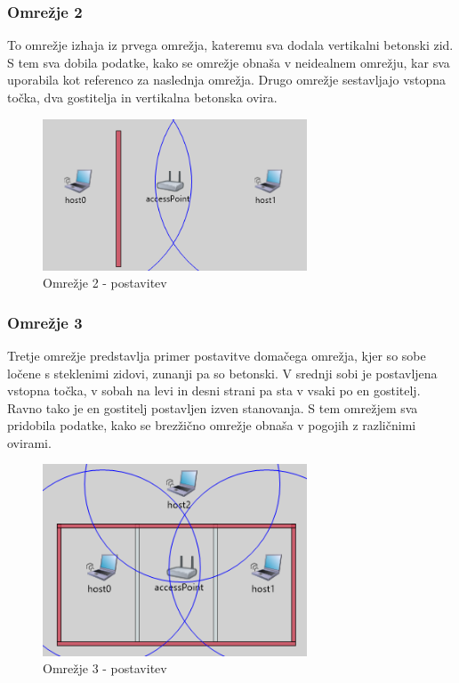 \documentclass[11pt,a4paper,slovene]{myarticle}
\begin{document}
\subsubsection{Omrežje 2}
To omrežje izhaja iz prvega omrežja, kateremu sva dodala vertikalni betonski zid. S tem sva dobila podatke, kako se omrežje obnaša v neidealnem omrežju, kar sva uporabila kot referenco za naslednja omrežja. Drugo omrežje sestavljajo vstopna točka, dva gostitelja in vertikalna betonska ovira.
\begin{figure}[h!]
	\centering
		\includegraphics[width=0.7\textwidth, keepaspectratio=true]{./images/om2-layout.png}
	\caption{Omrežje 2 - postavitev}
	\label{fig:om2layout}
\end{figure}

\subsubsection{Omrežje 3}
Tretje omrežje predstavlja primer postavitve domačega omrežja, kjer so sobe ločene s steklenimi zidovi, zunanji pa so betonski. V srednji sobi je postavljena vstopna točka, v sobah na levi in desni strani pa sta v vsaki po en gostitelj. Ravno tako je en gostitelj postavljen izven stanovanja. S tem omrežjem sva pridobila podatke, kako se brezžično omrežje obnaša v pogojih z različnimi ovirami.
\begin{figure}[h!]
	\centering
		\includegraphics[width=0.7\textwidth, keepaspectratio=true]{./images/om3-layout.png}
	\caption{Omrežje 3 - postavitev}
	\label{fig:om3layout}
\end{figure}
\end{document}
